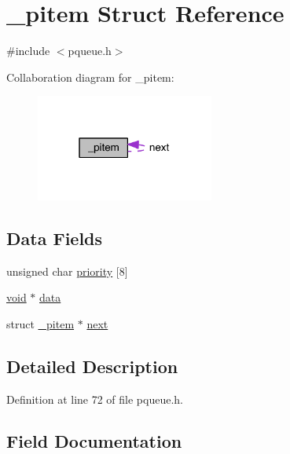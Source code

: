 \hypertarget{struct__pitem}{}\section{\+\_\+pitem Struct Reference}
\label{struct__pitem}


{\ttfamily \#include $<$pqueue.\+h$>$}



Collaboration diagram for \+\_\+pitem\+:\nopagebreak
\begin{figure}[H]
\begin{center}
\leavevmode
\includegraphics[width=166pt]{struct__pitem__coll__graph}
\end{center}
\end{figure}
\subsection*{Data Fields}
\begin{DoxyCompactItemize}
\item 
unsigned char \hyperlink{struct__pitem_aa60b3fab883b06b28d35213c80ce5566}{priority} \mbox{[}8\mbox{]}
\item 
\hyperlink{hw__4758__cca_8h_afad4d591c7931ff6dc5bf69c76c96aa0}{void} $\ast$ \hyperlink{struct__pitem_ac5c5967f62e5c3601479be651a8ed76c}{data}
\item 
struct \hyperlink{struct__pitem}{\+\_\+pitem} $\ast$ \hyperlink{struct__pitem_aa3360b2b2eda8aa41ad79e431f6f7ed1}{next}
\end{DoxyCompactItemize}


\subsection{Detailed Description}


Definition at line 72 of file pqueue.\+h.



\subsection{Field Documentation}
